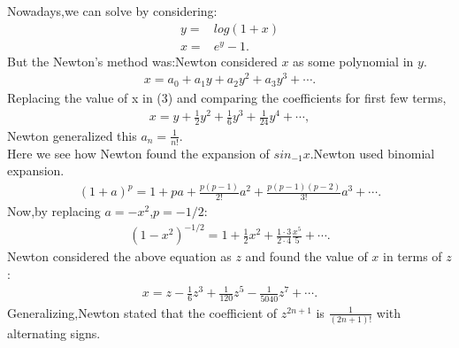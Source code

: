 \documentclass[a4paper,reqno,11pt]{book}
\theoremstyle{plain}%
\theoremstyle{definition}
\begin{document}
Nowadays,we can solve by considering:
\begin{align*}
    y=&log(1+x)\\
    x=&e^y-1.
\end{align*}
But the Newton's method was:Newton considered $x$ as some polynomial in $y$.
\begin{eqnarray*}
    x=a_{0}+a_{1}y+a_{2}y^2+a_{3}y^3+\cdots.
\end{eqnarray*}
Replacing the value of x in (3) and comparing the coefficients for first few terms,
\begin{eqnarray*}
    x=y+\frac{1}{2}y^2+\frac{1}{6}y^3+\frac{1}{24}y^4+\cdots,
\end{eqnarray*}
Newton generalized this $a_{n}=\frac{1}{n!}$.\\
Here we see how Newton found the expansion of $sin_{-1}x$.Newton used binomial expansion.
\begin{eqnarray*}
    (1+a)^p=1+pa+\frac{p(p-1)}{2!}a^2+\frac{p(p-1)(p-2)}{3!}a^3+\cdots.
\end{eqnarray*}
Now,by replacing $a=-x^2$,$p=-1/2$:
\begin{eqnarray*}
    (1-x^2)^{-1/2}=1+\frac{1}{2}x^2+\frac{1\cdot3}{2\cdot4}\frac{x^5}{5}+\cdots.
\end{eqnarray*}
Newton considered the above equation as $z$ and found the value of $x$ in terms of $z$:
\begin{eqnarray*}
    x=z-\frac{1}{6}z^3+\frac{1}{120}z^5-\frac{1}{5040}z^7+\cdots.
\end{eqnarray*}
Generalizing,Newton stated that the coefficient of $z^{2n+1}$ is $\frac{1}{(2n+1)!}$ with alternating signs.
\end{document}
